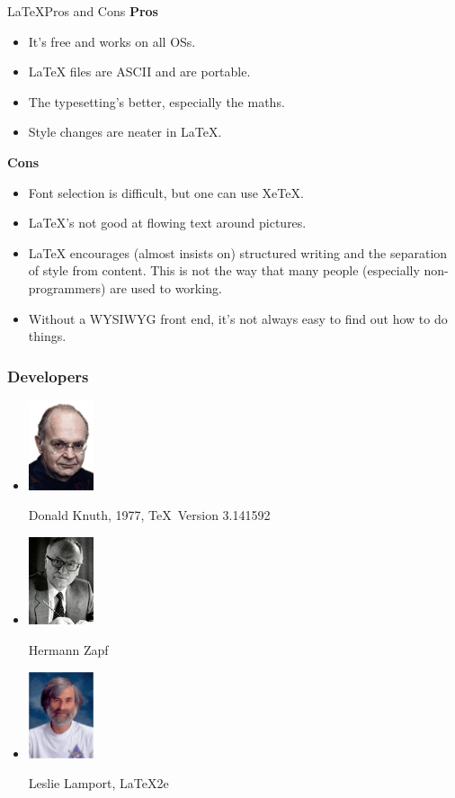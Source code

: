 \documentclass[10pt,xcolor=table]{beamer}
\begin{document}
\begin{frame}{\LaTeX Pros and Cons}
\textbf{Pros}
\begin{itemize}
\item    It's free and works on all OSs.
\item    LaTeX files are ASCII and are portable.
\item    The typesetting's better, especially the maths.
\item    Style changes are neater in LaTeX. 
\end{itemize}
\textbf{Cons}
\begin{itemize}
\item    Font selection is difficult, but one can use XeTeX.
\item    LaTeX's not good at flowing text around pictures.
\item    LaTeX encourages (almost insists on) structured writing and the separation of style from content. This is not the way that many people (especially non-programmers) are used to working.
\item    Without a WYSIWYG front end, it's not always easy to find out how to do things.
\end{itemize}
\end{frame}
\begin{frame}
\frametitle{Developers}
\begin{itemize}
\item
\parbox{0.25\textwidth}{\includegraphics[width=0.15\textwidth]{figs/Donald_Knuth.png}}\hspace{0cm}
\parbox{0.65\textwidth}{Donald Knuth, 1977, \TeX ~Version 3.141592}
\item
\parbox{0.25\textwidth}{\includegraphics[width=0.15\textwidth]{figs/Hermann.jpg}}\hspace{0cm}
\parbox{0.65\textwidth}{Hermann Zapf}
\item
\parbox{0.25\textwidth}{\includegraphics[width=0.15\textwidth]{figs/Leslie.png}}\hspace{0cm}
\parbox{0.65\textwidth}{Leslie Lamport, \LaTeX2e}
\end{itemize}
\end{frame}
\end{document}
